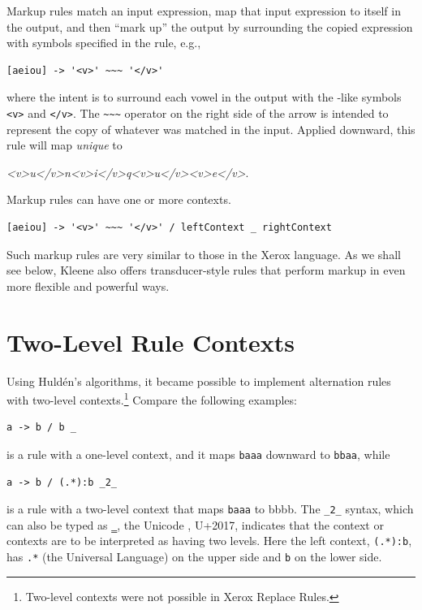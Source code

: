 Markup rules match an input expression, map that input expression to itself in the output, and then ``mark up'' the
output by surrounding the copied expression with symbols specified in
the rule, e.g.,

\begin{Verbatim}
[aeiou] -> '<v>' ~~~ '</v>'
\end{Verbatim}

\noindent
where the intent is to surround each vowel in the output with the
-like symbols \verb!<v>! and \verb!</v>!.  The \verb!~~~!
operator on the right side of the arrow is intended to represent the copy
of whatever was matched in the input.  Applied downward,
this rule will map \emph{unique} to 

\noindent
\emph{<v>u</v>n<v>i</v>q<v>u</v><v>e</v>}.

Markup rules can have one or more contexts.

\begin{Verbatim}
[aeiou] -> '<v>' ~~~ '</v>' / leftContext _ rightContext
\end{Verbatim}

\noindent
Such markup rules are very similar to those in the Xerox \xfst{}
language.  As we shall see below, Kleene also offers transducer-style rules that perform
markup in even more flexible and powerful ways.

\section{Two-Level Rule Contexts}

Using Huld\'en's algorithms, it became possible to implement alternation rules with two-level contexts.\footnote{Two-level contexts
were not possible in Xerox Replace Rules.}
Compare the following examples:

\begin{Verbatim}
a -> b / b _
\end{Verbatim}

\noindent
is a rule with a one-level context, and it maps \texttt{baaa} downward to \texttt{bbaa}, while

\begin{Verbatim}
a -> b / (.*):b _2_
\end{Verbatim}

\noindent
is a rule with a two-level context that maps \texttt{baaa} to {bbbb}.  The
\verb!_2_! syntax, which can also be typed as ‗, the Unicode
,  U+2017, indicates that the context or contexts are to be interpreted as
having two levels.  Here the left context, \verb!(.*):b!, has \verb!.*! (the Universal Language) on the upper side and \verb!b! on the
lower side.

